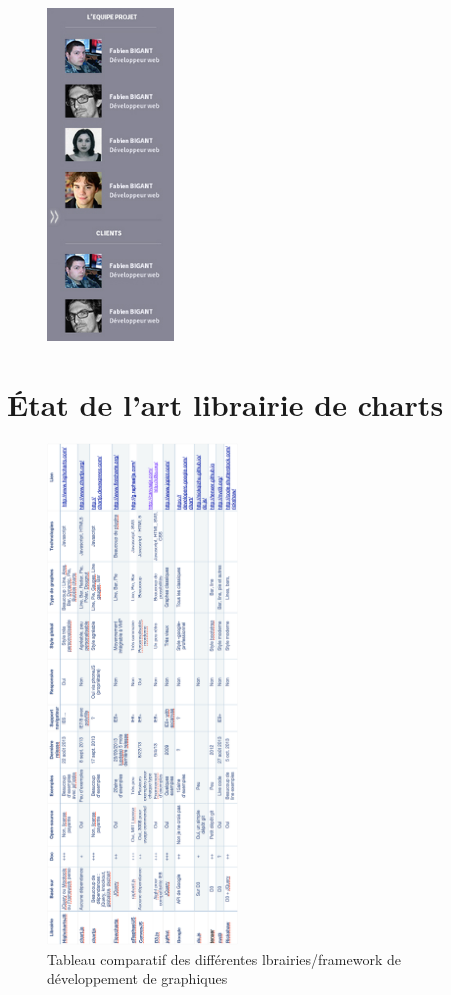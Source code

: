 \documentclass[12pt]{report}
\begin{document}
\begin{appendices}
\begin{figure}[H]
	\centering
	\includegraphics[width=0.3\textwidth]{pictures/maquetteVersusmind/barreMembres.jpg}
	\caption{}
	\label{16}
\end{figure}
	
	\chapter{État de l'art librairie de charts}
	
	\begin{figure}[!h]
	\centering
	\includegraphics[width=0.45\textwidth]{pictures/comparatifcharts.png}
	\caption{Tableau comparatif des différentes lbrairies/framework de développement de graphiques}
	\label{a4}
\end{figure}
	

\end{appendices}
\end{document}
